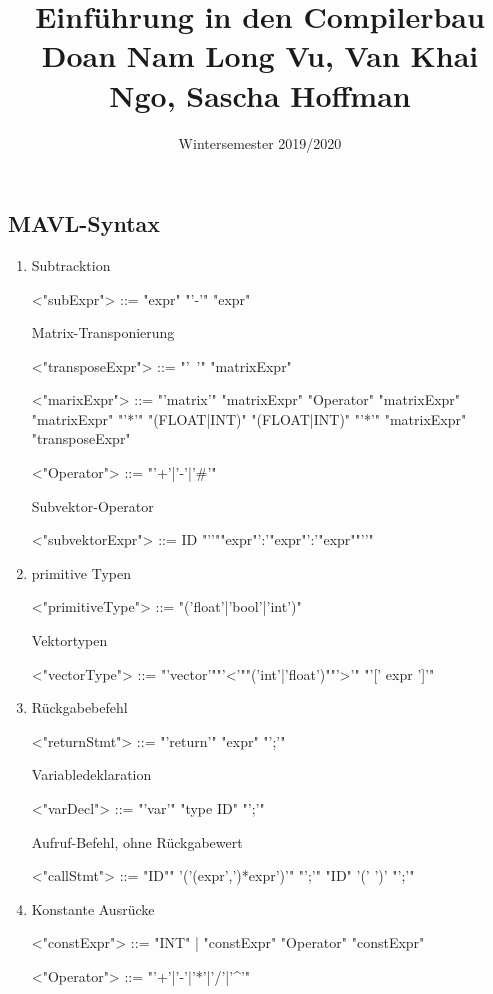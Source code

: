 \documentclass[twoside,colorbacktitle,accentcolor=tud2b]{tudexercise}
\title{\textsf{Einführung in den \linebreak Compilerbau} \linebreak \small Doan Nam Long Vu, Van Khai Ngo, Sascha Hoffman}
\subtitle{Wintersemester 2019/2020}
\begin{document}
\setcounter{section}{1}
\maketitle
  \subsection{MAVL-Syntax}
  \begin{enumerate}
  	\item 
  	\subitem Subtracktion
  	\begin{grammar}
  	<"subExpr"> ::= "expr" "'-'" "expr"
  \end{grammar}
  \subitem Matrix-Transponierung
  \begin{grammar}
  	<"transposeExpr"> ::= "'~'"  "matrixExpr" 

	<"marixExpr"> ::= "'matrix'" 
	\alt "matrixExpr" "Operator" "matrixExpr"
	\alt "matrixExpr" "'*'" "(FLOAT|INT)"
	\alt  "(FLOAT|INT)" "'*'" "matrixExpr" 
	\alt "transposeExpr"

	<"Operator"> ::= "'+'|'-'|'#'" 
\end{grammar}
\subitem Subvektor-Operator
  \begin{grammar}
	<"subvektorExpr"> ::= ID "'{'""expr"':'"expr"':'"expr""'}'" 
\end{grammar}
 
  \item primitive Typen
 \begin{grammar}
 	 <"primitiveType"> ::= "('float'|'bool'|'int')"
\end{grammar}

 \subitem Vektortypen
  \begin{grammar}
 	<"vectorType"> ::= "'vector'""'<'""('int'|'float')""'>'" "'[' expr ']'"
 	
 \end{grammar}

 \item  Rückgabebefehl
 \begin{grammar}
 	<"returnStmt"> ::= "'return'" "expr" "';'"
 \end{grammar}
 
 \subitem Variabledeklaration
 	\begin{grammar}
 	<"varDecl"> ::=   "'var'" "type ID" "';'"
 \end{grammar}

 \subitem Aufruf-Befehl, ohne Rückgabewert
  \begin{grammar}
  	<"callStmt"> ::= "ID"" '('(expr',')*expr')'" "';'"
  	\alt "ID" '(' ')' "';'"
  \end{grammar}
  
 \item Konstante Ausrücke
 
 \begin{grammar}
 	<"constExpr"> ::= "INT" | "constExpr" "Operator" "constExpr"
 	
 	<"Operator"> ::= "'+'|'-'|'*'|'/'|'^'"
 \end{grammar} 
  \end{enumerate}
\clearpage
\end{document}
